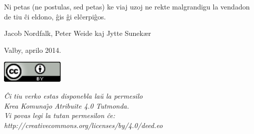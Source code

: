 {\frenchspacing
Ni petas (ne postulas, sed petas) ke viaj uzoj ne rekte malgrandigu la
vendadon de tiu \^ci eldono, \^gis \^gi el\^cerpi\^gos.}


{
Jacob Nordfalk, Peter Weide kaj Jytte Sunek{\ae}r}

{
Valby, aprilo 2014.}


\begin{center}
	\includegraphics[width=3cm]{permisilo.png}
\end{center}

\begin{center}
{\frenchspacing\itshape
\^Ci tiu verko estas disponebla la\u{u} la permesilo\\
Krea Komuna\^{\j}o Atribuite 4.0 Tutmonda.\\
Vi povas legi la tutan permesilon \^ce:\\
http://creativecommons.org/licenses/by/4.0/deed.eo}
\end{center}
